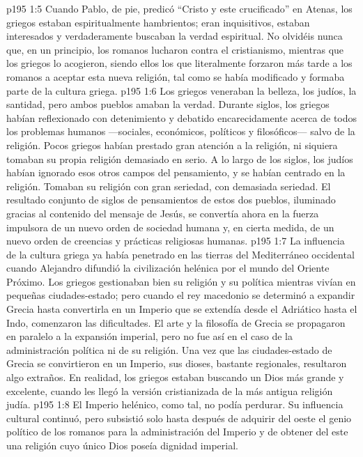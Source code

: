 \vs p195 1:5 \pc Cuando Pablo, de pie, predicó “Cristo y este crucificado” en Atenas, los griegos estaban espiritualmente hambrientos; eran inquisitivos, estaban interesados y verdaderamente buscaban la verdad espiritual. No olvidéis nunca que, en un principio, los romanos lucharon contra el cristianismo, mientras que los griegos lo acogieron, siendo ellos los que literalmente forzaron más tarde a los romanos a aceptar esta nueva religión, tal como se había modificado y formaba parte de la cultura griega.
\vs p195 1:6 Los griegos veneraban la belleza, los judíos, la santidad, pero ambos pueblos amaban la verdad. Durante siglos, los griegos habían reflexionado con detenimiento y debatido encarecidamente acerca de todos los problemas humanos ---sociales, económicos, políticos y filosóficos--- salvo de la religión. Pocos griegos habían prestado gran atención a la religión, ni siquiera tomaban su propia religión demasiado en serio. A lo largo de los siglos, los judíos habían ignorado esos otros campos del pensamiento, y se habían centrado en la religión. Tomaban su religión con gran seriedad, con demasiada seriedad. El resultado conjunto de siglos de pensamientos de estos dos pueblos, iluminado gracias al contenido del mensaje de Jesús, se convertía ahora en la fuerza impulsora de un nuevo orden de sociedad humana y, en cierta medida, de un nuevo orden de creencias y prácticas religiosas humanas.
\vs p195 1:7 \pc La influencia de la cultura griega ya había penetrado en las tierras del Mediterráneo occidental cuando Alejandro difundió la civilización helénica por el mundo del Oriente Próximo. Los griegos gestionaban bien su religión y su política mientras vivían en pequeñas ciudades\hyp{}estado; pero cuando el rey macedonio se determinó a expandir Grecia hasta convertirla en un Imperio que se extendía desde el Adriático hasta el Indo, comenzaron las dificultades. El arte y la filosofía de Grecia se propagaron en paralelo a la expansión imperial, pero no fue así en el caso de la administración política ni de su religión. Una vez que las ciudades\hyp{}estado de Grecia se convirtieron en un Imperio, sus dioses, bastante regionales, resultaron algo extraños. En realidad, los griegos estaban buscando  un Dios más grande y excelente, cuando les llegó la versión cristianizada de la más antigua religión judía.
\vs p195 1:8 El Imperio helénico, como tal, no podía perdurar. Su influencia cultural continuó, pero subsistió solo hasta después de adquirir del oeste el genio político de los romanos para la administración del Imperio y de obtener del este una religión cuyo único Dios poseía dignidad imperial.
